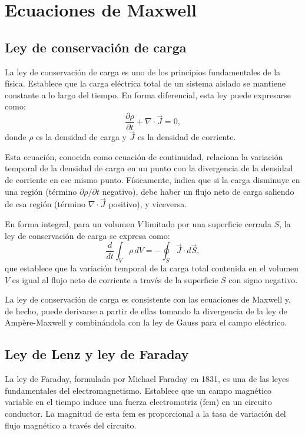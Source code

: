 \documentclass[12pt,a4paper]{book}
\begin{document}
\chapter{Ecuaciones de Maxwell}
\section{Ley de conservación de carga}

La ley de conservación de carga es uno de los principios fundamentales de la física. Establece que la carga eléctrica total de un sistema aislado se mantiene constante a lo largo del tiempo. En forma diferencial, esta ley puede expresarse como:
\begin{equation}
\frac{\partial \rho}{\partial t} + \nabla \cdot \vec{J} = 0,
\end{equation}
donde $\rho$ es la densidad de carga y $\vec{J}$ es la densidad de corriente.

Esta ecuación, conocida como ecuación de continuidad, relaciona la variación temporal de la densidad de carga en un punto con la divergencia de la densidad de corriente en ese mismo punto. Físicamente, indica que si la carga disminuye en una región (término $\partial \rho / \partial t$ negativo), debe haber un flujo neto de carga saliendo de esa región (término $\nabla \cdot \vec{J}$ positivo), y viceversa.

En forma integral, para un volumen $V$ limitado por una superficie cerrada $S$, la ley de conservación de carga se expresa como:
\begin{equation}
\frac{d}{dt} \int_V \rho \, dV = -\oint_S \vec{J} \cdot d\vec{S},
\end{equation}
que establece que la variación temporal de la carga total contenida en el volumen $V$ es igual al flujo neto de corriente a través de la superficie $S$ con signo negativo.

La ley de conservación de carga es consistente con las ecuaciones de Maxwell y, de hecho, puede derivarse a partir de ellas tomando la divergencia de la ley de Ampère-Maxwell y combinándola con la ley de Gauss para el campo eléctrico.

\section{Ley de Lenz y ley de Faraday}

La ley de Faraday, formulada por Michael Faraday en 1831, es una de las leyes fundamentales del electromagnetismo. Establece que un campo magnético variable en el tiempo induce una fuerza electromotriz (fem) en un circuito conductor. La magnitud de esta fem es proporcional a la tasa de variación del flujo magnético a través del circuito.
\end{document}
